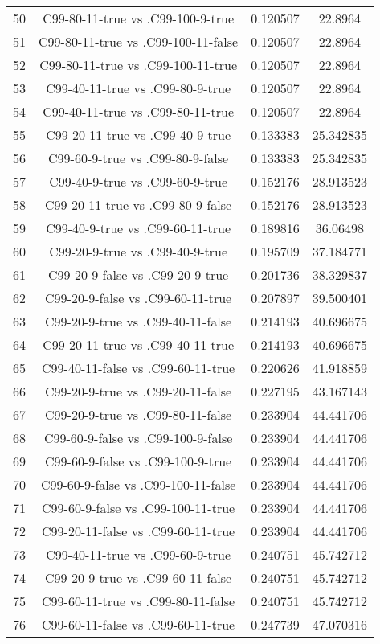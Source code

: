 \documentclass[a4paper,10pt]{article}
\begin{document}
\begin{landscape}
\begin{table}[!htp]
\begin{tabular}{cccc}
50&C99-80-11-true vs .C99-100-9-true&0.120507&22.8964\\
51&C99-80-11-true vs .C99-100-11-false&0.120507&22.8964\\
52&C99-80-11-true vs .C99-100-11-true&0.120507&22.8964\\
53&C99-40-11-true vs .C99-80-9-true&0.120507&22.8964\\
54&C99-40-11-true vs .C99-80-11-true&0.120507&22.8964\\
55&C99-20-11-true vs .C99-40-9-true&0.133383&25.342835\\
56&C99-60-9-true vs .C99-80-9-false&0.133383&25.342835\\
57&C99-40-9-true vs .C99-60-9-true&0.152176&28.913523\\
58&C99-20-11-true vs .C99-80-9-false&0.152176&28.913523\\
59&C99-40-9-true vs .C99-60-11-true&0.189816&36.06498\\
60&C99-20-9-true vs .C99-40-9-true&0.195709&37.184771\\
61&C99-20-9-false vs .C99-20-9-true&0.201736&38.329837\\
62&C99-20-9-false vs .C99-60-11-true&0.207897&39.500401\\
63&C99-20-9-true vs .C99-40-11-false&0.214193&40.696675\\
64&C99-20-11-true vs .C99-40-11-true&0.214193&40.696675\\
65&C99-40-11-false vs .C99-60-11-true&0.220626&41.918859\\
66&C99-20-9-true vs .C99-20-11-false&0.227195&43.167143\\
67&C99-20-9-true vs .C99-80-11-false&0.233904&44.441706\\
68&C99-60-9-false vs .C99-100-9-false&0.233904&44.441706\\
69&C99-60-9-false vs .C99-100-9-true&0.233904&44.441706\\
70&C99-60-9-false vs .C99-100-11-false&0.233904&44.441706\\
71&C99-60-9-false vs .C99-100-11-true&0.233904&44.441706\\
72&C99-20-11-false vs .C99-60-11-true&0.233904&44.441706\\
73&C99-40-11-true vs .C99-60-9-true&0.240751&45.742712\\
74&C99-20-9-true vs .C99-60-11-false&0.240751&45.742712\\
75&C99-60-11-true vs .C99-80-11-false&0.240751&45.742712\\
76&C99-60-11-false vs .C99-60-11-true&0.247739&47.070316\\

\end{tabular}
\end{table}
\end{landscape}
\end{document}
